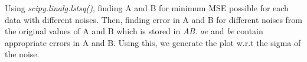 \documentclass[11pt]{article}
\begin{document}
Using \emph{scipy.linalg.lstsq()}, finding A and B for minimum MSE
possible for each data with different noises. Then, finding error in A
and B for different noises from the original values of A and B which is
stored in \emph{AB}. \emph{ae} and \emph{be} contain appropriate errors
in A and B. Using this, we generate the plot w.r.t the sigma of the
noise.

	

	
		
	
	
		
			
		
	
		
			
		
	
		
			
		
	
		
			
		
	
		
			
		
	
		
			
		
	
		
			
		
	
		
			
		
	
		
			
		
	
		
			
		
	
		
			
		
	
		
			
		
	
		
			
		
	
\end{document}
